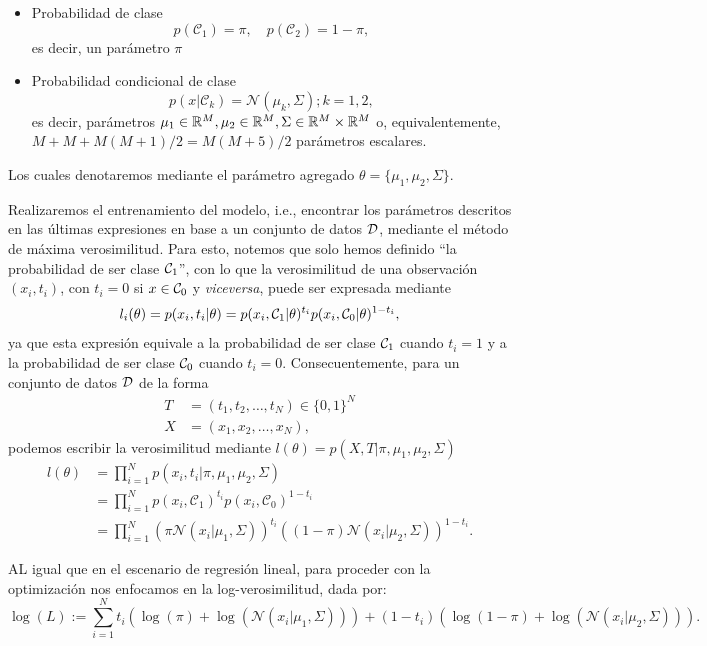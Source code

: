 \begin{itemize}
	\item Probabilidad de clase
	\begin{equation}
	 	p(\mathcal{C}_1)=\pi,\quad  p(\mathcal{C}_2)=1-\pi,\label{eq:prob_clase}
	 \end{equation}  es decir,  un parámetro $\pi$
	\item Probabilidad condicional de clase 
	\begin{equation}
		p(x|\mathcal{C}_k) = \mathcal{N}(\mu_k,  \Sigma); k=1,2,\label{eq:prob_clase_cond}
	\end{equation} 
	es decir, parámetros $ \mu_1\in{\mathbb R}^M,\mu_2\in{\mathbb R}^M,\Sigma\in{\mathbb R}^M\times{\mathbb R}^M$ o, equivalentemente, $M + M + M(M+1)/2=M(M+5)/2$ parámetros escalares. 
\end{itemize}
Los cuales denotaremos mediante el parámetro agregado $\theta =\{\mu_1,\mu_2,\Sigma \}$.

Realizaremos el entrenamiento del modelo, i.e., encontrar los parámetros descritos en las últimas expresiones en base a un conjunto de datos ${\mathcal D}$, mediante el método de máxima verosimilitud. Para esto, notemos que solo hemos definido ``la probabilidad de ser clase ${\mathcal C}_1$'', con lo que la verosimilitud de una observación $(x_i,t_i)$, con $t_i = 0$ si $x\in{\mathcal C}_0$ y \emph{viceversa}, puede ser expresada mediante
\begin{equation}
	l_i(\theta) = p(x_i, t_i|\theta) =  p(x_i,{\mathcal C}_1|\theta)^{t_i}p(x_i,{\mathcal C}_0|\theta)^{1-t_i}, 
\end{equation}
ya que esta expresión equivale a la probabilidad de ser clase ${\mathcal C}_1$ cuando $t_i=1$ y a la probabilidad de ser clase ${\mathcal C}_0$ cuando $t_i=0$. Consecuentemente, para un conjunto de datos ${\mathcal D}$ de la forma
	\begin{align}
	T&=(t_1,t_2,\ldots,t_N) \in \{0,1\}^N\\
	X&=(x_1,x_2,\ldots,x_N),
	\end{align}
podemos escribir la verosimilitud mediante $l(\theta) = p(X,T|\pi,\mu_1,\mu_2,\Sigma) $
\begin{align}
	l(\theta) &= \prod_{i=1}^{N}p(x_i,t_i|\pi,\mu_1,\mu_2,\Sigma)\nonumber\\
	&= \prod_{i=1}^{N}p(x_i,\mathcal{C}_1)^{t_i}p(x_i,\mathcal{C}_0)^{1-t_i}\nonumber\\
	&= \prod_{i=1}^{N}(\pi\mathcal{N}(x_i|\mu_1,\Sigma))^{t_i}
	((1-\pi)\mathcal{N}(x_i|\mu_2,\Sigma))^{1-t_i}.
	\end{align}

AL igual que en el escenario de regresión lineal, para proceder con la optimización nos enfocamos en la log-verosimilitud, dada por:	
	\begin{equation}
	\log(L) := \sum_{i=1}^{N}t_i(\log(\pi)+\log(\mathcal{N}(x_i|\mu_1,\Sigma)))+(1-t_i)(\log(1-\pi)+\log(\mathcal{N}(x_i|\mu_2,\Sigma))). 
		\end{equation}

